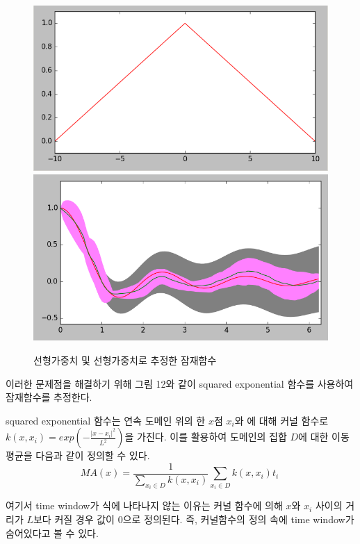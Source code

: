 \documentclass[a4paper]{oblivoir}
\begin{document}
\begin{figure}[ht] \centering
\centering
\includegraphics[scale=0.30]{fig12_26.png}\hspace{0.1cm}\includegraphics[scale=0.30]{fig12_27.png}
\caption{선형가중치 및 선형가중치로 추정한 잠재함수}
\label{fig:12-12}
\end{figure}

이러한 문제점을 해결하기 위해 그림 12와 같이 squared exponential 함수를 사용하여 잠재함수를 추정한다. 

squared exponential 함수는 연속 도메인 위의 한 $x$점 $x_{i}$와 에 대해 커널 함수로 $k(x, x_{i}) = exp\left(- \frac{{\left|x-x_{i} \right|}^{2}}{L^{2}} \right)$을 가진다. 이를 활용하여 도메인의 집합 $D$에 대한 이동 평균을 다음과 같이 정의할 수 있다.\\

\begin{equation}
MA(x) = \frac{1}{\sum_{x_{i} \in D}k(x,x_{i})}\sum_{x_{i} \in D}k(x,x_{i})t_{i}\
\label{eq:12-7}
\end{equation} 
 
여기서 time window가 식에 나타나지 않는 이유는 커널 함수에 의해 $x$와 $x_{i}$ 사이의 거리가 $L$보다 커질 경우 값이 0으로 정의된다. 즉, 커널함수의 정의 속에 time window가 숨어있다고 볼 수 있다.\\
\end{document}
